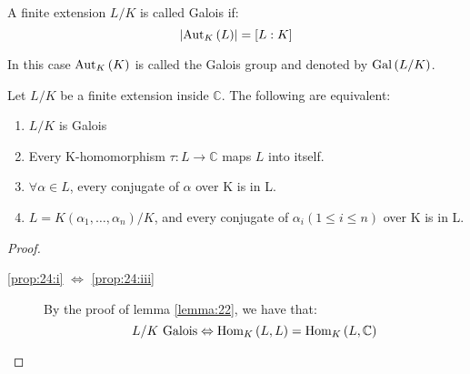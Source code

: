 \begin{definition}
  \label{def:23}
  A finite extension $L/K$ is called Galois if:
  \begin{equation*}
    \left|\text{Aut}_{K}\left(L\right)\right| = [L : K]
  \end{equation*}
\end{definition}
In this case $\text{Aut}_{K}\left(K\right)$ is called the Galois group and denoted by $\text{Gal}\left(L/K\right)$.

\begin{proposition}
  \label{prop:24}
  Let $L/K$ be a finite extension inside $\mathbb{C}$. The following are equivalent:

  \begin{enumerate}
  \item $L/K$ is Galois \label{prop:24:i}
  \item Every K-homomorphism $\tau : L \rightarrow \mathbb{C}$ maps $L$ into itself. \label{prop:24:ii}
  \item $\forall \alpha \in L$, every conjugate of $\alpha$ over K is in L.\label{prop:24:iii}
  \item $L = K(\alpha_1, \ldots, \alpha_n)/K$, and every conjugate of $\alpha_i (1 \leq i \leq n)$ over K is in L. \label{prop:24:iv}
  \end{enumerate}
\end{proposition}

\begin{proof}
  \begin{description}
  \item[\ref{prop:24:i} $\Leftrightarrow$ \ref{prop:24:iii}] By the proof of lemma \eqref{lemma:22}, we have that:
    \begin{equation*}
      L/K \ \text{Galois} \Leftrightarrow \text{Hom}_{K}\left(L, L\right) = \text{Hom}_{K}\left(L, \mathbb{C}\right)
    \end{equation*}
  \end{description}
  
\end{proof}
